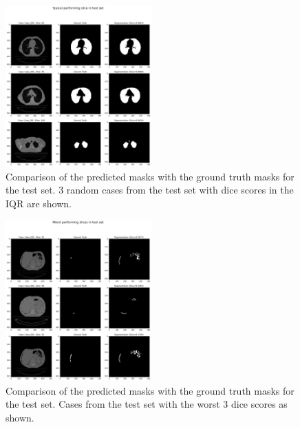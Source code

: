 \documentclass[11pt]{article}
\begin{document}
\begin{figure}[H]
    \centering
    \includegraphics[width=0.5\textwidth]{figs/Typical performing slice in test set.png}
    \caption{Comparison of the predicted masks with the ground truth masks for the test set. 3 random cases from the test set with dice scores in the IQR are shown.}
    \label{fig:typical_test_mask_comparison}
\end{figure}

\begin{figure}[H]
    \centering
    \includegraphics[width=0.5\textwidth]{figs/Worst performing slices in test set.png}   
    \caption{Comparison of the predicted masks with the ground truth masks for the test set. Cases from the test set with the worst 3 dice scores as shown.}
    \label{fig:worst_test_mask_comparison}
\end{figure}
\end{document}
